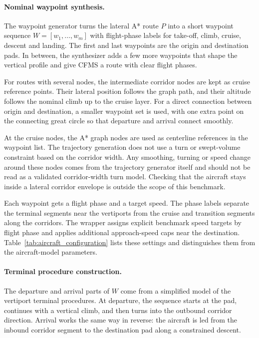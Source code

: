 \paragraph{Nominal waypoint synthesis.}
The waypoint generator turns the lateral A* route \(P\) into a short waypoint sequence \(W=[w_1,\dots,w_m]\) with flight-phase labels for take-off, climb, cruise, descent and landing. The first and last waypoints are the origin and destination pads. In between, the synthesizer adds a few more waypoints that shape the vertical profile and give CFMS a route with clear flight phases.

For routes with several nodes, the intermediate corridor nodes are kept as cruise reference points. Their lateral position follows the graph path, and their altitude follows the nominal climb up to the cruise layer. For a direct connection between origin and destination, a smaller waypoint set is used, with one extra point on the connecting great circle so that departure and arrival connect smoothly.

At the cruise nodes, the A* graph nodes are used as centerline references in the waypoint list. The trajectory generation does not use a turn or swept-volume constraint based on the corridor width. Any smoothing, turning or speed change around these nodes comes from the trajectory generator itself and should not be read as a validated corridor-width turn model. Checking that the aircraft stays inside a lateral corridor envelope is outside the scope of this benchmark.

Each waypoint gets a flight phase and a target speed. The phase labels separate the terminal segments near the vertiports from the cruise and transition segments along the corridors. The wrapper assigns explicit benchmark speed targets by flight phase and applies additional approach-speed caps near the destination. Table~\ref{tab:aircraft_configuration} lists these settings and distinguishes them from the aircraft-model parameters.

\paragraph{Terminal procedure construction.}
The departure and arrival parts of \(W\) come from a simplified model of the vertiport terminal procedures. At departure, the sequence starts at the pad, continues with a vertical climb, and then turns into the outbound corridor direction. Arrival works the same way in reverse: the aircraft is led from the inbound corridor segment to the destination pad along a constrained descent.

